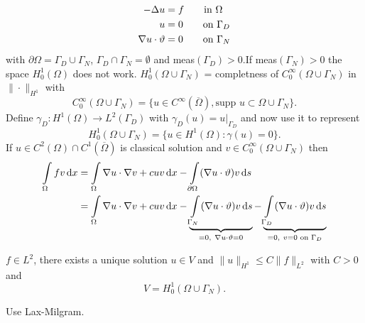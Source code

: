 \begin{enumerate}[=(\alph*)]
	\begin{align*}
				   	  -\Delta u &= f \qquad \text{in }\Omega\\
			 				    u &= 0 \qquad \text{on }\Gamma_D\\
		 \nabla u \cdot \vartheta &= 0 \qquad \text{on }\Gamma_N
	\end{align*}
	with $\partial \Omega = \Gamma_D \cup \Gamma_N$, $ \Gamma_D \cap \Gamma_N = \emptyset$ and meas$(\Gamma_D) >0$.\enter If  meas$(\Gamma_N)>0$ the space $H^1_0(\Omega)$ does not work. $H^1_0(\Omega \cup \Gamma_N)$ = completness of $C^\infty_0(\Omega \cup \Gamma_N)$ in $\|\cdot\|_{H^1}$ with 
	\begin{equation*}
		C^\infty_0(\Omega \cup \Gamma_N) = \{ u \in C^\infty(\overline{\Omega}), \text{supp }u \subset \Omega \cup \Gamma_N  \}.
	\end{equation*}
	Define $\gamma_D: H^1(\Omega) \to L^2(\Gamma_D)$ with $\gamma_D(u) = u|_{\Gamma_D}$ and now use it to represent 
	\begin{equation*}
		H^1_0(\Omega \cup \Gamma_N) = \{ u \in H^1(\Omega): \gamma(u) = 0 \}.
	\end{equation*}
	If $u \in C^2(\Omega) \cap C^1(\overline{\Omega})$ is classical solution and $v \in C^\infty_0(\Omega \cup \Gamma_N)$ then
	\begin{align*}
		\int \limits_\Omega fv \mathop{}\!\mathrm{d} x &= \int \limits_\Omega \nabla u \cdot  \nabla v + cuv \mathop{}\!\mathrm{d} x - \int \limits_{\partial\Omega} (\nabla u \cdot \vartheta)v \mathop{}\!\mathrm{d} s\\
		 &= \int \limits_\Omega \nabla u \cdot  \nabla v + cuv \mathop{}\!\mathrm{d} x -   \underbrace{\int \limits_{\Gamma_N} (\nabla u \cdot \vartheta)v \mathop{}\!\mathrm{d} s}_{=0,\ \nabla u \cdot \vartheta =0 } - \underbrace{\int \limits_{\Gamma_D} (\nabla u \cdot \vartheta)v \mathop{}\!\mathrm{d} s}_{=0,\ v=0 \text{ on } \Gamma_D} \\
	\end{align*}
	\begin{thrm}
		$f \in L^2$, there exists a unique solution $u\in V$ and $\|u\|_{H^1} \leq C\|f\|_{L^2}$ with $C>0$ and
		\begin{equation*}
			V = H^1_0(\Omega \cup \Gamma_N).
		\end{equation*}
	\end{thrm}
	\begin{proof_}
		Use Lax-Milgram.
	\end{proof_}
\end{enumerate}

